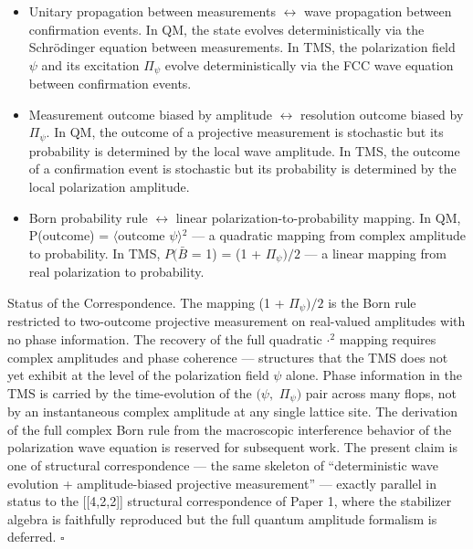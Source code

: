 \documentclass[11pt,oneside]{report}
\theoremstyle{definition}
\theoremstyle{remark}
\begin{document}
\begin{itemize}
\item
  Unitary propagation between measurements \ensuremath{\leftrightarrow} wave propagation between
  confirmation events. In QM, the state evolves deterministically via
  the Schrödinger equation between measurements. In TMS, the
  polarization field \ensuremath{\psi} and its excitation \ensuremath{\Pi_{\psi}} evolve deterministically
  via the FCC wave equation between confirmation events.
\item
  Measurement outcome biased by amplitude \ensuremath{\leftrightarrow} resolution outcome biased by
  \ensuremath{\Pi_{\psi}.} In QM, the outcome of a projective measurement is stochastic but
  its probability is determined by the local wave amplitude. In TMS, the
  outcome of a confirmation event is stochastic but its probability is
  determined by the local polarization amplitude.
\item
  Born probability rule \ensuremath{\leftrightarrow} linear polarization-to-probability mapping. In
  QM, P(outcome) = \textbar\ensuremath{\langle \text{outcome}} \textbar{} \ensuremath{\psi \rangle}\textbar\ensuremath{^{2}} --- a
  quadratic mapping from complex amplitude to probability. In TMS, \ensuremath{P(\bar{B}} =
  1) = (1 + \ensuremath{\Pi_{\psi})/2} --- a linear mapping from real polarization to
  probability.
\end{itemize}

Status of the Correspondence. The mapping (1 + \ensuremath{\Pi_{\psi})/2} is the Born rule
restricted to two-outcome projective measurement on real-valued
amplitudes with no phase information. The recovery of the full quadratic
\textbar\ensuremath{\cdot}\textbar\ensuremath{^{2}} mapping requires complex amplitudes and phase
coherence --- structures that the TMS does not yet exhibit at the level
of the polarization field \ensuremath{\psi} alone. Phase information in the TMS is
carried by the time-evolution of the \ensuremath{(\psi ,} \ensuremath{\Pi_{\psi})} pair across many flops,
not by an instantaneous complex amplitude at any single lattice site.
The derivation of the full complex Born rule from the macroscopic
interference behavior of the polarization wave equation is reserved for
subsequent work. The present claim is one of structural correspondence
--- the same skeleton of ``deterministic wave evolution +
amplitude-biased projective measurement'' --- exactly parallel in status
to the [[4,2,2]] structural correspondence of Paper 1, where the
stabilizer algebra is faithfully reproduced but the full quantum
amplitude formalism is deferred. \hfill\ensuremath{\square}
\end{document}
